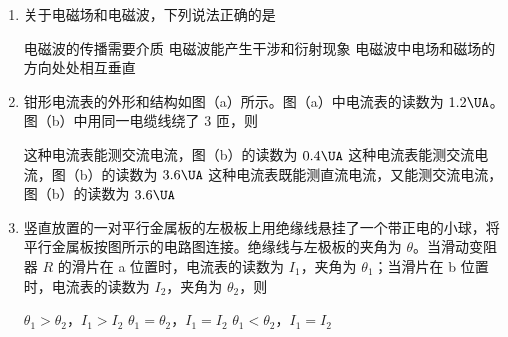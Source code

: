 \documentclass[\gkver]{gaokaozhenti}
\begin{document}
\begin{enumerate}

\item
关于电磁场和电磁波，下列说法正确的是

{电磁波的传播需要介质}
{电磁波能产生干涉和衍射现象}
{电磁波中电场和磁场的方向处处相互垂直}


\item
钳形电流表的外形和结构如图（a）所示。图（a）中电流表的读数为 $1.2\UA$。图（b）中用同一电缆线绕了 3 匝，则


{这种电流表能测交流电流，图（b）的读数为 $0.4\UA$}
{这种电流表能测交流电流，图（b）的读数为 $3.6\UA$}
{这种电流表既能测直流电流，又能测交流电流，图（b）的读数为 $3.6\UA$}


\item
竖直放置的一对平行金属板的左极板上用绝缘线悬挂了一个带正电的小球，将平行金属板按图所示的电路图连接。绝缘线与左极板的夹角为 $\theta$。当滑动变阻器 $R$ 的滑片在 a 位置时，电流表的读数为 $I_{1}$，夹角为 $\theta_{1}$；当滑片在 b 位置时，电流表的读数为 $I_{2}$，夹角为 $\theta_{2}$，则


{$\theta_{1}>\theta_{2}$，$I_{1}>I_{2}$}
{$\theta_{1}=\theta_{2}$，$I_{1}=I_{2}$}
{$\theta_{1}<\theta_{2}$，$I_{1}=I_{2}$}



\end{enumerate}
\end{document}
